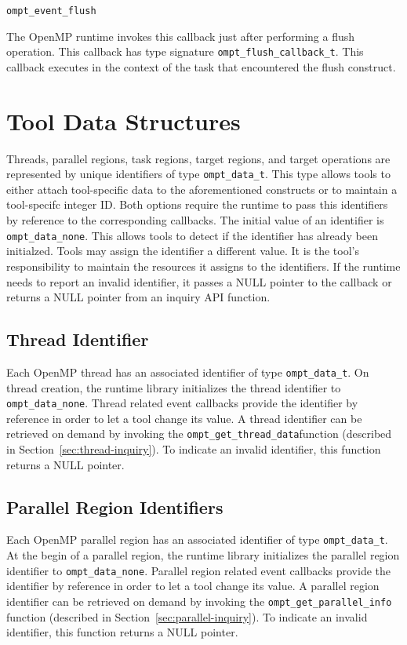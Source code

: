 \documentclass{article}
\newcommand{\descheader}[1]{{\needspace{3\baselineskip}\vspace{1em}\noindent \fbox{#1}}}
\begin{document}
\descheader{Miscellaneous}

\begin{description}

\item \verb|ompt_event_flush|

 \sloppy
   The OpenMP runtime invokes this callback just after
   performing a flush operation.  
   This callback has type signature \verb|ompt_flush_callback_t|. 
   This callback executes in the context of the task that encountered the flush construct.
\end{description}

\section{Tool Data Structures}
\label{sec:data}

Threads, parallel regions, task regions, target regions, and target operations are represented by unique identifiers of type \verb|ompt_data_t|.
This type allows tools to either attach tool-specific data to the aforementioned constructs or to maintain a tool-specifc integer ID.
Both options require the runtime to pass this identifiers by reference to the corresponding callbacks.
The initial value of an identifier is \verb|ompt_data_none|. This allows tools to detect if the identifier has already been initialzed.
Tools may assign the identifier a different value.
It is the tool's responsibility to maintain the resources it assigns to the identifiers.
If the runtime needs to report an invalid identifier, it passes a NULL pointer to the callback or returns a NULL pointer from an inquiry API function.

\subsection{Thread Identifier}
  Each OpenMP thread has an associated identifier of type \verb|ompt_data_t|.
  On thread creation, the runtime library initializes the thread identifier to \verb|ompt_data_none|.
  Thread related event callbacks provide the identifier by reference in order to let a tool change its value.
  A thread identifier can be retrieved on demand by invoking the \verb|ompt_get_thread_data|function (described in Section~\ref{sec:thread-inquiry}).
  To indicate an invalid identifier, this function returns a NULL pointer.

\subsection{Parallel Region Identifiers}
  Each OpenMP parallel region has an associated identifier of type \verb|ompt_data_t|.
  At the begin of a parallel region, the runtime library initializes the parallel region identifier to \verb|ompt_data_none|.
  Parallel region related event callbacks provide the identifier by reference in order to let a tool change its value.
  A parallel region identifier can be retrieved on demand by invoking the \verb|ompt_get_parallel_info| function (described in Section~\ref{sec:parallel-inquiry}).
  To indicate an invalid identifier, this function returns a NULL pointer.
 
\end{document}
